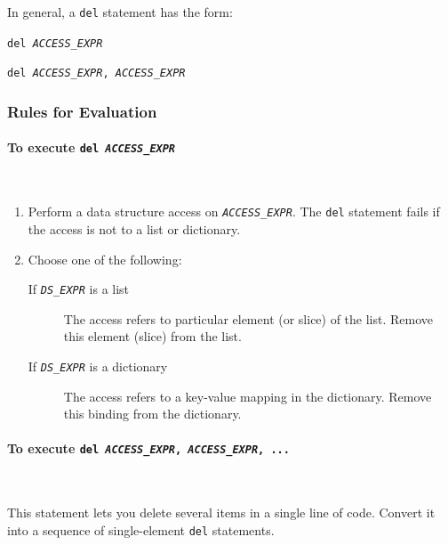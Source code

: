 \documentclass{article}
\newcommand{\expr}[1]{\texttt{#1}}
\newcommand{\kw}[1]{\expr{#1}}
\newcommand{\mvar}[1]{\expr{\emph{\uppercase{#1}}}}
\newcommand{\myparagraph}[1]{\paragraph{#1} \ifhevea\else \strut \\ \strut \fi}
\begin{document}
  In general, a \kw{del} statement has the form:

  \begin{description}
    \item \expr{del \mvar{ACCESS\_EXPR}}
    \item \expr{del \mvar{ACCESS\_EXPR}, \mvar{ACCESS\_EXPR}}
  \end{description}

\subsubsection{Rules for Evaluation}

  \myparagraph{To execute \expr{del \mvar{ACCESS\_EXPR}}}
  \begin{enumerate}
    \item
    Perform a data structure access on \mvar{ACCESS\_EXPR}. The \kw{del} statement fails if the access is not to a list or dictionary.

    \item
    Choose one of the following:
    \begin{description}
      \item[If \mvar{DS\_EXPR} is a list] The access refers to particular element (or slice) of the list. Remove this element (slice) from the list.
      \item[If \mvar{DS\_EXPR} is a dictionary] The access refers to a key-value mapping in the dictionary. Remove this binding from the dictionary.
    \end{description}

  \end{enumerate}

  \myparagraph{To execute \expr{del \mvar{ACCESS\_EXPR}, \mvar{ACCESS\_EXPR}, ...}}
  This statement lets you delete several items in a single line of code.
  Convert it into a sequence of single-element \expr{del} statements.

%
%
%
\end{document}
